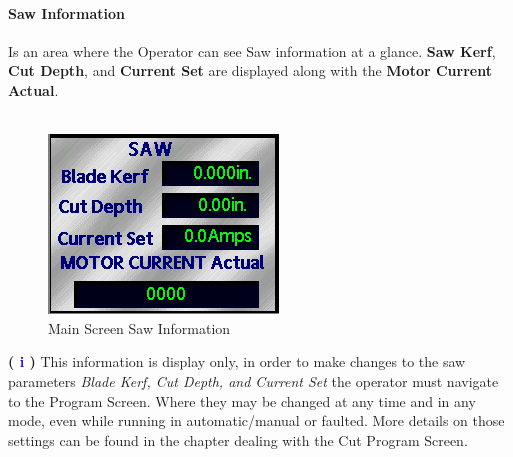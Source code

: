 \paragraph{Saw Information}
Is an area where the Operator can see Saw information at a glance. \textbf{Saw Kerf}, \textbf{Cut Depth}, and \textbf{Current Set} are displayed along with the \textbf{Motor Current Actual}.
\\
\\
\begin{figure}
	\centering
	\includegraphics[width=.5\linewidth]{screen-captures/saw-info}
	\caption{Main Screen Saw Information}
	\label{fig:main-sawinfo}
\end{figure}
\textbf{\LARGE ( \textcolor{blue}{i} )} This information is display only, in order to make changes to the saw parameters \textit{Blade Kerf, Cut Depth, and Current Set} the operator must navigate to the Program Screen. Where they may be changed at any time and in any mode, even while running in automatic/manual or faulted. More details on those settings can be found in the chapter dealing with the Cut Program Screen.
\\
\\
\\
\\
\\
\\
\\
\\
\\
\\
\pagebreak
